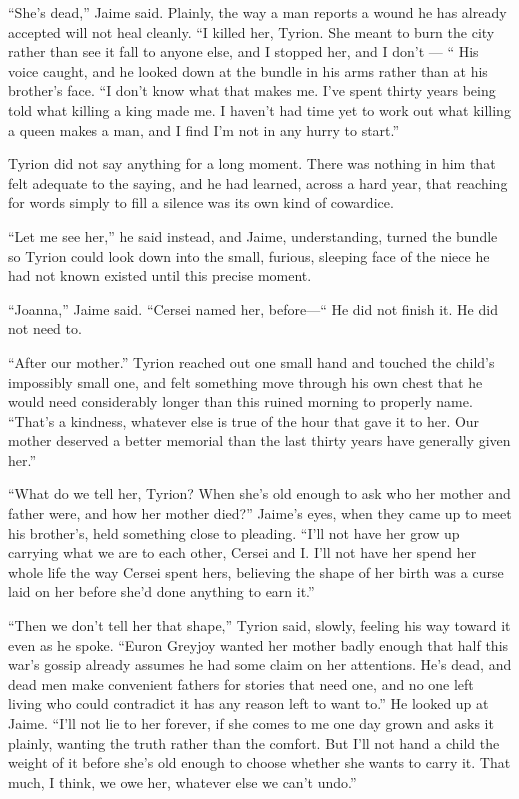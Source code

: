 “She’s dead,” Jaime said. Plainly, the way a man reports a wound he has already accepted will not heal cleanly. “I killed her, Tyrion. She meant to burn the city rather than see it fall to anyone else, and I stopped her, and I don’t — “ His voice caught, and he looked down at the bundle in his arms rather than at his brother’s face. “I don’t know what that makes me. I’ve spent thirty years being told what killing a king made me. I haven’t had time yet to work out what killing a queen makes a man, and I find I’m not in any hurry to start.”

Tyrion did not say anything for a long moment. There was nothing in him that felt adequate to the saying, and he had learned, across a hard year, that reaching for words simply to fill a silence was its own kind of cowardice.

“Let me see her,” he said instead, and Jaime, understanding, turned the bundle so Tyrion could look down into the small, furious, sleeping face of the niece he had not known existed until this precise moment.

“Joanna,” Jaime said. “Cersei named her, before—“ He did not finish it. He did not need to.

“After our mother.” Tyrion reached out one small hand and touched the child’s impossibly small one, and felt something move through his own chest that he would need considerably longer than this ruined morning to properly name. “That’s a kindness, whatever else is true of the hour that gave it to her. Our mother deserved a better memorial than the last thirty years have generally given her.”

“What do we tell her, Tyrion? When she’s old enough to ask who her mother and father were, and how her mother died?” Jaime’s eyes, when they came up to meet his brother’s, held something close to pleading. “I’ll not have her grow up carrying what we are to each other, Cersei and I. I’ll not have her spend her whole life the way Cersei spent hers, believing the shape of her birth was a curse laid on her before she’d done anything to earn it.”

“Then we don’t tell her that shape,” Tyrion said, slowly, feeling his way toward it even as he spoke. “Euron Greyjoy wanted her mother badly enough that half this war’s gossip already assumes he had some claim on her attentions. He’s dead, and dead men make convenient fathers for stories that need one, and no one left living who could contradict it has any reason left to want to.” He looked up at Jaime. “I’ll not lie to her forever, if she comes to me one day grown and asks it plainly, wanting the truth rather than the comfort. But I’ll not hand a child the weight of it before she’s old enough to choose whether she wants to carry it. That much, I think, we owe her, whatever else we can’t undo.”

